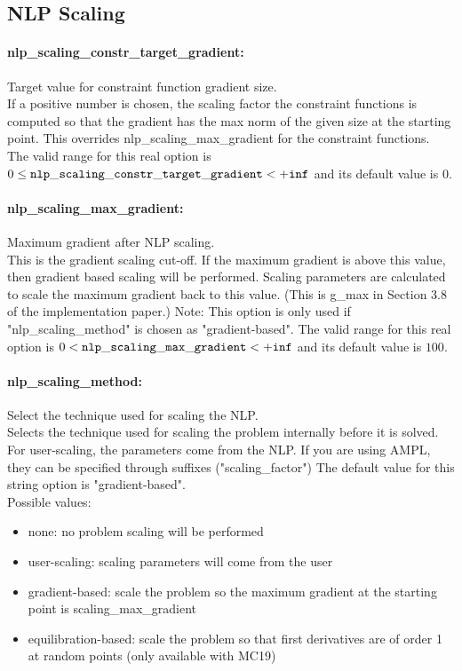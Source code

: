 \subsection{NLP Scaling}
\label{sec:NLP_Scaling}
\paragraph{nlp\_scaling\_constr\_target\_gradient:}\label{sec:nlp_scaling_constr_target_gradient} Target value for constraint function gradient size. $\;$ \\
 If a positive number is chosen, the scaling
factor the constraint functions is computed so
that the gradient has the max norm of the given
size at the starting point.  This overrides
nlp\_scaling\_max\_gradient for the constraint
functions. The valid range for this real option is 
$0 \le {\tt nlp\_scaling\_constr\_target\_gradient } <  {\tt +inf}$
and its default value is $0$.


\paragraph{nlp\_scaling\_max\_gradient:}\label{sec:nlp_scaling_max_gradient} Maximum gradient after NLP scaling. $\;$ \\
 This is the gradient scaling cut-off. If the
maximum gradient is above this value, then
gradient based scaling will be performed. Scaling
parameters are calculated to scale the maximum
gradient back to this value. (This is g\_max in
Section 3.8 of the implementation paper.) Note:
This option is only used if
"nlp\_scaling\_method" is chosen as
"gradient-based". The valid range for this real option is 
$0 <  {\tt nlp\_scaling\_max\_gradient } <  {\tt +inf}$
and its default value is $100$.


\paragraph{nlp\_scaling\_method:}\label{sec:nlp_scaling_method} Select the technique used for scaling the NLP. $\;$ \\
 Selects the technique used for scaling the
problem internally before it is solved. For
user-scaling, the parameters come from the NLP.
If you are using AMPL, they can be specified
through suffixes ("scaling\_factor")
The default value for this string option is "gradient-based".
\\ 
Possible values:
\begin{itemize}
   \item none: no problem scaling will be performed
   \item user-scaling: scaling parameters will come from the user
   \item gradient-based: scale the problem so the maximum gradient at
the starting point is scaling\_max\_gradient
   \item equilibration-based: scale the problem so that first derivatives are
of order 1 at random points (only available
with MC19)
\end{itemize}

